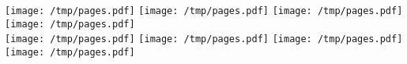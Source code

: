 \documentclass[a4paper,landscape]{article}
\begin{document}
\texttt{[image: /tmp/pages.pdf]}\hfill
\texttt{[image: /tmp/pages.pdf]}\hfill
\texttt{[image: /tmp/pages.pdf]}\hfill
\texttt{[image: /tmp/pages.pdf]}\\
\texttt{[image: /tmp/pages.pdf]}\hfill
\texttt{[image: /tmp/pages.pdf]}\hfill
\texttt{[image: /tmp/pages.pdf]}\hfill
\texttt{[image: /tmp/pages.pdf]}\hfill
\end{document}
